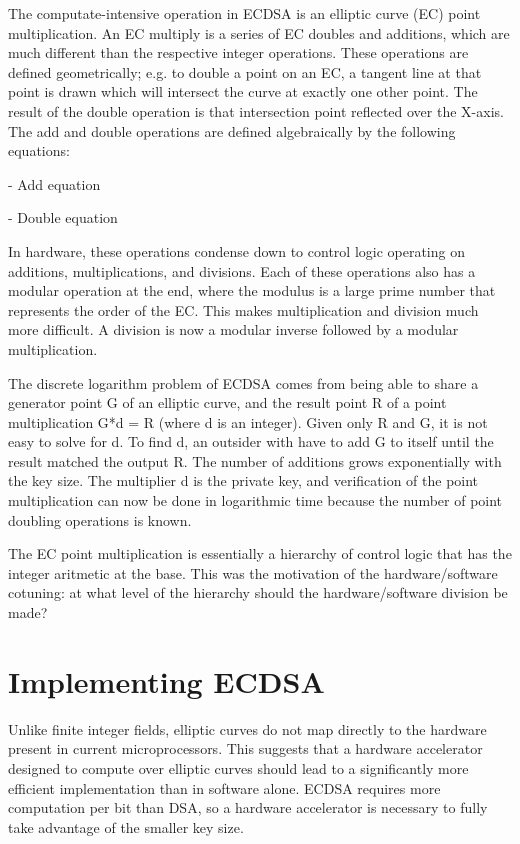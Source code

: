\documentclass[twocolumn]{article}
\begin{document}
The computate-intensive operation in ECDSA is an elliptic curve (EC) point 
multiplication. An EC multiply is a series of EC doubles and additions, which
are much different than the respective integer operations. These operations
are defined geometrically; e.g. to double a point on an EC, a tangent line at that
point is drawn which will intersect the curve at exactly one other point. The result 
of the double operation is that intersection point reflected over the X-axis.
The add and double operations are defined algebraically by the following equations:

- Add equation

- Double equation

In hardware, these operations condense down to control logic operating on additions, multiplications, 
and divisions. Each of these operations also has a modular operation at the end, where the modulus is a 
large prime number that represents the order of the EC. This makes multiplication and division
much more difficult. A division is now a modular inverse followed by a modular multiplication. 

The discrete logarithm problem of ECDSA comes from being able to share a generator point
G of an elliptic curve, and the result point R of a point multiplication G*d = R 
(where d is an integer). Given only R and G, it is not easy to solve for d. To find d, an
outsider with have to add G to itself until the result matched the output R. The number
of additions grows exponentially with the key size. The multiplier d is the private key, 
and verification of the point multiplication can now be done in logarithmic time because
the number of point doubling operations is known. 

The EC point multiplication is essentially a hierarchy of control logic that has the integer 
aritmetic at the base. This was the motivation of the hardware/software cotuning: at what level
of the hierarchy should the hardware/software division be made?

\section{Implementing ECDSA}

Unlike finite integer fields, elliptic curves do not map directly to
the hardware present in current microprocessors\cite{kss-ecdsa}. This
suggests that a hardware accelerator designed to compute over elliptic
curves should lead to a significantly more efficient implementation
than in software alone.  ECDSA requires more computation per bit than
DSA, so a hardware accelerator is necessary to fully take advantage of
the smaller key size.
\end{document}
